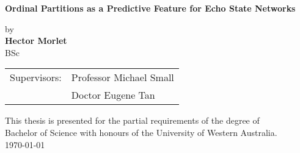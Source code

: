 
\vspace*{0.4cm}
\begin{center}
{ \huge \bfseries Ordinal Partitions as a Predictive Feature for Echo State Networks  \\[0.4cm] }
\vspace{1cm}
\end{center}
\begin{center}
\large
by\\
\vspace{1.5cm}
\textbf{Hector Morlet}\\
BSc\\
\vspace{1cm}
\end{center}
\vspace{3cm}

\begin{tabular}{ p{2.2cm}l } 
Supervisors: & Professor Michael Small\\
			&  Doctor Eugene Tan
\end{tabular}

\vfill
\begin{center}
This thesis is presented for the partial requirements of the degree of\\ Bachelor of Science with honours
of the University of Western Australia.\\
\today
\end{center}
\vspace{2.5cm}